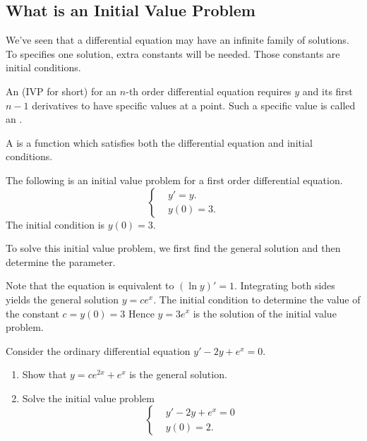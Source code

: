 \subsection{What is an Initial Value Problem}

We've seen that a differential equation may have an infinite family of solutions. To specifies one solution, extra constants will be needed. Those constants are initial conditions.

\begin{definition}{}{}
  An  (IVP for short) for an $n$-th order differential equation requires $y$ and its first $n-1$ derivatives to have specific values at a point. Such a specific value is called an .

  A  is a function which satisfies both the differential equation and initial conditions.
\end{definition}

\begin{example} The following is an initial value problem for a first order differential equation.
  $$
    \begin{cases}
       & y ' = y.      \\
       & y(0)   =  3 .
    \end{cases}
  $$
  The initial condition is $y(0)=3$.

  To solve this initial value problem, we first find the general solution and then determine the parameter.

  Note that the equation is equivalent to $(\ln y)'=1$.
  Integrating both sides yields the general solution $y = c e^x$.
  The initial condition to determine the value of the constant $c=y(0)=3$
  Hence $y = 3 e^x$ is the solution of the initial value problem.
\end{example}

\begin{exercise}
  Consider the ordinary differential equation $y'  - 2y  + e^{x} =0 $.
  \begin{enumerate}
    \item Show that $y =  c e^{2x}  + e^{x}$ is the general solution.
    \item Solve the initial value problem
          $$
            \begin{cases}
               & y'  -2y  + e^{x} =  0 \\
               & y(0)   =   2.
            \end{cases}
          $$
  \end{enumerate}
\end{exercise}

